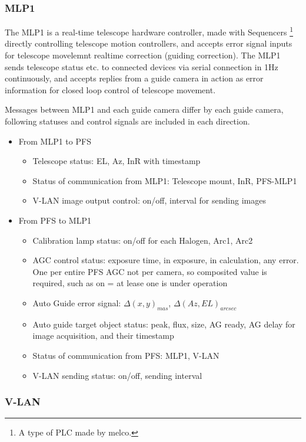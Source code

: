 \documentclass[a4paper,notitlepage]{article}
\begin{document}
\subsubsection{MLP1}

The MLP1 is a real-time telescope hardware controller, made with Sequencers 
\footnote{A type of PLC made by melco. }
directly controlling telescope motion controllers, and accepts error signal 
inputs for telescope movelemnt realtime correction (guiding correction). 
The MLP1 sends telescope status etc. to connected devices via serial connection 
in 1Hz continuously, and accepts replies from a guide camera in action 
as error information for closed loop control of telescope movement. 

Messages between MLP1 and each guide camera differ by each guide camera, 
following statuses and control signals are included in each direction. 
\begin{itemize}
  \item From MLP1 to PFS
  \begin{itemize}
    \item Telescope status: EL, Az, InR with timestamp
    \item Status of communication from MLP1: Telescope mount, InR, PFS-MLP1
    \item V-LAN image output control: on/off, interval for sending images
  \end{itemize}
  \item From PFS to MLP1
  \begin{itemize}
    \item Calibration lamp status: on/off for each Halogen, Arc1, Arc2
    \item AGC control status: exposure time, in exposure, in calculation, any 
      error. One per entire PFS AGC not per camera, so composited value is 
      required, such as on = at lease one is under operation
    \item Auto Guide error signal: $\Delta (x, y)_{mas}$,
      $\Delta (Az, EL)_{arcsec}$
    \item Auto guide target object status: peak, flux, size, AG ready, AG delay 
      for image acquisition, and their timestamp
    \item Status of communication from PFS: MLP1, V-LAN
    \item V-LAN sending status: on/off, sending interval
  \end{itemize}
\end{itemize}

\subsubsection{V-LAN}
\end{document}
